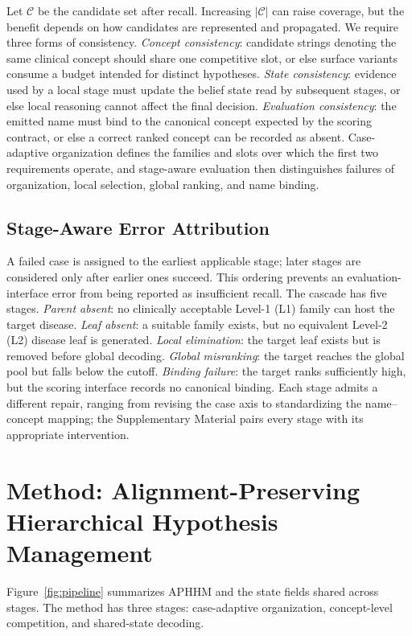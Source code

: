 \documentclass[letterpaper]{article} %
\begin{document}
Let $\mathcal{C}$ be the candidate set after recall.
Increasing $|\mathcal{C}|$ can raise coverage, but the benefit depends on how candidates are represented and propagated.
We require three forms of consistency.
\emph{Concept consistency}: candidate strings denoting the same clinical concept should share one competitive slot, or else surface variants consume a budget intended for distinct hypotheses.
\emph{State consistency}: evidence used by a local stage must update the belief state read by subsequent stages, or else local reasoning cannot affect the final decision.
\emph{Evaluation consistency}: the emitted name must bind to the canonical concept expected by the scoring contract, or else a correct ranked concept can be recorded as absent.
Case-adaptive organization defines the families and slots over which the first two requirements operate, and stage-aware evaluation then distinguishes failures of organization, local selection, global ranking, and name binding.

\subsection{Stage-Aware Error Attribution}
\label{sec:taxonomy}

A failed case is assigned to the earliest applicable stage; later stages are considered only after earlier ones succeed.
This ordering prevents an evaluation-interface error from being reported as insufficient recall.
The cascade has five stages.
\emph{Parent absent}: no clinically acceptable Level-1 (L1) family can host the target disease.
\emph{Leaf absent}: a suitable family exists, but no equivalent Level-2 (L2) disease leaf is generated.
\emph{Local elimination}: the target leaf exists but is removed before global decoding.
\emph{Global misranking}: the target reaches the global pool but falls below the cutoff.
\emph{Binding failure}: the target ranks sufficiently high, but the scoring interface records no canonical binding.
Each stage admits a different repair, ranging from revising the case axis to standardizing the name--concept mapping; the Supplementary Material pairs every stage with its appropriate intervention.

\section{Method: Alignment-Preserving Hierarchical Hypothesis Management}
\label{sec:method}

Figure~\ref{fig:pipeline} summarizes APHHM and the state fields shared across stages.
The method has three stages: case-adaptive organization, concept-level competition, and shared-state decoding.
\end{document}
